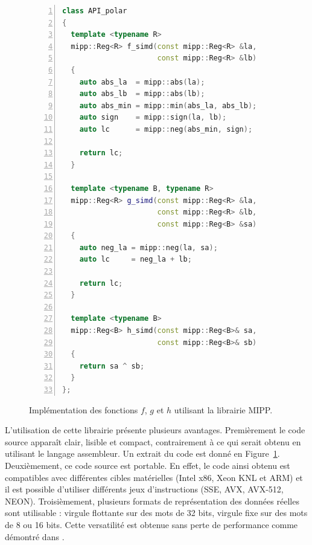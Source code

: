   \lstset{linewidth=0.7\textwidth, xleftmargin=0.025\textwidth, xrightmargin=0.05\textwidth}

  \begin{figure}[t]
  \begin{lstlisting}[language=C++, numbers=left, numbersep=0.3em, tabsize=2, basicstyle=\footnotesize\ttfamily]
class API_polar
{
  template <typename R>
  mipp::Reg<R> f_simd(const mipp::Reg<R> &la,
                      const mipp::Reg<R> &lb)
  {
    auto abs_la  = mipp::abs(la);
    auto abs_lb  = mipp::abs(lb);
    auto abs_min = mipp::min(abs_la, abs_lb);
    auto sign    = mipp::sign(la, lb);
    auto lc      = mipp::neg(abs_min, sign);

    return lc;
  }

  template <typename B, typename R>
  mipp::Reg<R> g_simd(const mipp::Reg<R> &la,
                      const mipp::Reg<R> &lb,
                      const mipp::Reg<B> &sa)
  {
    auto neg_la = mipp::neg(la, sa);
    auto lc     = neg_la + lb;

    return lc;
  }

  template <typename B>
  mipp::Reg<B> h_simd(const mipp::Reg<B>& sa,
                      const mipp::Reg<B>& sb)
  {
    return sa ^ sb;
  }
};
  \end{lstlisting}
  \caption{Implémentation des fonctions $f$, $g$ et $h$ utilisant la librairie MIPP.}
  \label{fig:mipp}
  \end{figure}
L'utilisation de cette librairie présente plusieurs avantages. Premièrement le code source apparaît clair, lisible et compact, contrairement à ce qui serait obtenu en utilisant le langage assembleur. Un extrait du code est donné en Figure~\ref{fig:mipp}. Deuxièmement, ce code source est portable. En effet, le code ainsi obtenu est compatibles avec différentes cibles matérielles (Intel x86, Xeon KNL et ARM) et il est possible d'utiliser différents jeux d'instructions (SSE, AVX, AVX-512, NEON). Troisièmement, plusieurs formats de représentation des données réelles sont utilisable : virgule flottante sur des mots de 32 bits, virgule fixe sur des mots de 8 ou 16 bits. Cette versatilité est obtenue sans perte de performance comme démontré dans \cite{cassagne2018mipp}.

